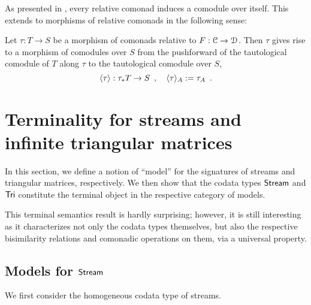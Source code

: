 \documentclass[a4paper,USenglish]{lipics}
\begin{document}
As presented in , every relative comonad induces a comodule over itself.
This extends to morphisms of relative comonads in the following sense:

\begin{defn}%
\label{def:induced} 
  Let $\tau : T\to S$ be a morphism of comonads relative to $F : {\mathcal{C}} \to \mathcal{D}$.
  Then $\tau$ gives rise to a morphism of comodules over $S$ from the pushforward of the tautological comodule
  of $T$ along $\tau$ to the tautological comodule over $S$,
  \[ \langle {\tau} \rangle : \tau_*T \to S \enspace , \quad \langle {\tau} \rangle_A := \tau_A \enspace . \]
\end{defn}




\section{Terminality for streams and infinite triangular matrices}\label{sec:coalgebras_for_tri}

In this section, we define a notion of \enquote{model} for the signatures of streams and triangular matrices,
respectively. We then show that the codata types $\mathsf{Stream}$ and $\mathsf{Tri}$ constitute the terminal object in
the respective category of models.


This terminal semantics result is hardly surprising; however, it is still interesting as it characterizes not only the codata types themselves,
 but also the respective bisimilarity relations and comonadic operations on them, via a universal property.



\begin{Long}
\subsection{Models for $\mathsf{Stream}$}

We first consider the homogeneous codata type of streams.
\end{Long}
\end{document}
